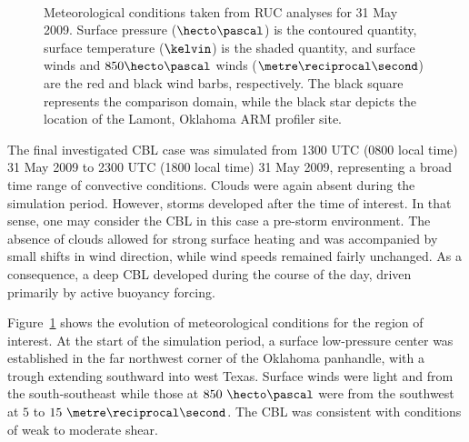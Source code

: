 \begin{figure}[H]
     \begin{center}
%
        \\ %
%
    \end{center}
    \caption{%
        Meteorological conditions taken from RUC analyses for 31 May 2009. Surface pressure ($\hecto\pascal$) is the contoured quantity, surface temperature ($\kelvin$) is the shaded quantity, and surface winds and $850\hecto\pascal$ winds ($\metre\reciprocal\second$) are the red and black wind barbs, respectively. The black square represents the comparison domain, while the black star depicts the location of the Lamont, Oklahoma ARM profiler site.}%
   \label{figure434}
\end{figure}


The final investigated CBL case was simulated from 1300 UTC (0800 local time) 31 May 2009 to 2300 UTC (1800 local time) 31 May 2009, representing a broad time range of convective conditions. Clouds were again absent during the simulation period. However, storms developed after the time of interest. In that sense, one may consider the CBL in this case a pre-storm environment. The absence of clouds allowed for strong surface heating and was accompanied by small shifts in wind direction, while wind speeds remained fairly unchanged. As a consequence, a deep CBL developed during the course of the day, driven primarily by active buoyancy forcing. 

Figure~\ref{figure434} shows the evolution of meteorological conditions for the region of interest. At the start of the simulation period, a surface low-pressure center was established in the far northwest corner of the Oklahoma panhandle, with a trough extending southward into west Texas. Surface winds were light and from the south-southeast while those at $850\mbox{ }\hecto\pascal$ were from the southwest at $5$ to $15\mbox{ }\metre\reciprocal\second$. The CBL was consistent with conditions of weak to moderate shear. 

